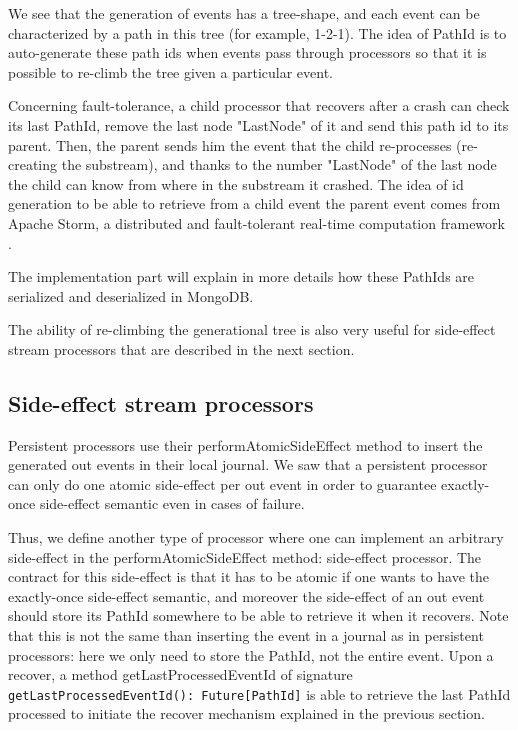 We see that the generation of events has a tree-shape, and each event can be characterized by a path in this tree (for example, 1-2-1). The idea of PathId is to
auto-generate these path ids when events pass through processors so that it is possible to re-climb the tree given a particular event.

Concerning fault-tolerance, a child processor that recovers after a crash can check its last PathId, remove the last node "LastNode" of it and send this path id to its parent. Then, the parent sends him the event that the child re-processes (re-creating the substream), and thanks to the number "LastNode" of the last node the child can know from where in the substream it crashed. The idea of id generation to be able to retrieve from a child event the parent event comes from Apache Storm, a distributed and fault-tolerant real-time computation framework .

The implementation part will explain in more details how these PathIds are serialized and deserialized in MongoDB.

The ability of re-climbing the generational tree is also very useful for side-effect stream processors that are described in the next section.

\subsection{Side-effect stream processors}
\label{sec:sideeffectproc}

Persistent processors use their performAtomicSideEffect method to insert the generated out events in their local journal. We saw that a persistent processor can only do one
atomic side-effect per out event in order to guarantee exactly-once side-effect semantic even in cases of failure.

Thus, we define another type of processor where one can implement an arbitrary side-effect in the performAtomicSideEffect method: side-effect processor. The contract
for this side-effect is that it has to be atomic if one wants to have the exactly-once side-effect semantic, and moreover the side-effect of an out event should store
its PathId somewhere to be able to retrieve it when it recovers. Note that this is not the same than inserting the event in a journal as in persistent processors:
here we only need to store the PathId, not the entire event. Upon a recover, a method getLastProcessedEventId of signature 
\verb|getLastProcessedEventId(): Future[PathId]| is able to retrieve the last PathId processed to initiate the recover mechanism explained in the previous section.
\\

